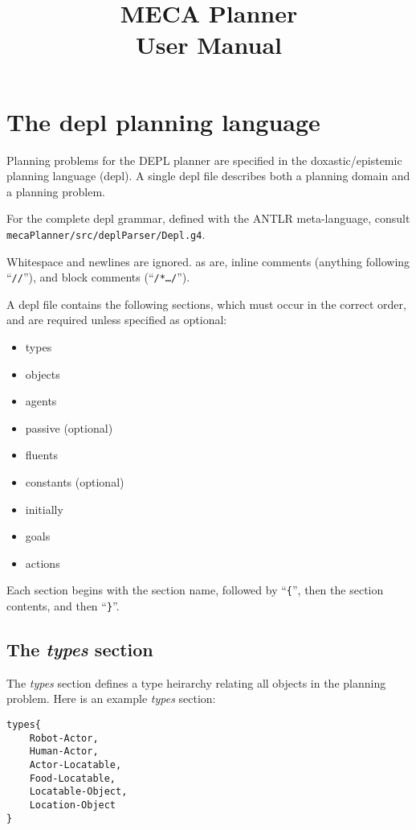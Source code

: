 \documentclass{article}
\title{MECA Planner  \\
\large User Manual
}
\begin{document}
\maketitle

\section{The depl planning language}

Planning problems for the DEPL planner are specified in the doxastic/epistemic
planning language (depl). A single depl file describes both a planning domain
and a planning problem.

For the complete depl grammar, defined with the ANTLR meta-language, consult
\texttt{mecaPlanner/src/deplParser/Depl.g4}.

Whitespace and newlines are ignored.
as are, inline comments (anything
following ``\texttt{//}''), and block comments (``\texttt{/*\ldots*/}'').


A depl file contains the following sections, which must occur in the correct
order, and are required unless specified as optional:

\begin{itemize}
\item types
\item objects
\item agents
\item passive (optional)
\item fluents
\item constants (optional)
\item initially
\item goals
\item actions
\end{itemize}

\noindent
Each section begins with the section name, followed by
``\verb|{|'', 
then the section contents, and then
``\verb|}|''. 


\subsection{The \emph{types} section}

The \emph{types} section defines a type heirarchy relating all objects in the planning
problem.
Here is an example \emph{types} section:
\begin{verbatim}
types{
    Robot-Actor,
    Human-Actor,
    Actor-Locatable,
    Food-Locatable,
    Locatable-Object,
    Location-Object
}
\end{verbatim}
\end{document}
